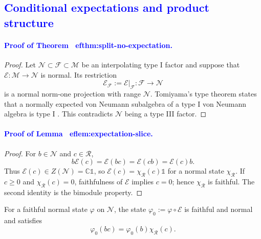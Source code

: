 \documentclass[a4paper,11pt]{article}
\theoremstyle{definition}
\let\mathbbm\mathds
\newcommand{\mR}{\mathcal{R}}
\newcommand{\mN}{\mathcal{N}}
\newcommand{\mM}{\mathcal{M}}
\newcommand{\NL}[1]{\textcolor{blue}{#1}}
\newcommand{\mE}{\mathcal{E}}
\begin{document}
\subsection{\NL{Conditional expectations and product structure}}
\label{app:expectation-proofs}

\NL{\paragraph{Proof of Theorem~
ef{thm:split-no-expectation}.}}
\begin{proof}
Let $\mN\subset\mathcal F\subset\mM$ be an interpolating type I
factor and suppose that $\mE:\mM\to \mN$ is normal.  Its restriction
\begin{equation}
 \mE_{\mathcal F}:=\mE|_{\mathcal F}:\mathcal F\longrightarrow\mN
\end{equation}
is a normal norm-one projection with range $\mN$.  Tomiyama's type
theorem states that a normally expected von Neumann subalgebra of a type I von
Neumann algebra is type I \cite{Tomiyama1959}\cite{Takesaki1972}. This contradicts $\mN$ being a type III factor.
\end{proof}

\NL{\paragraph{Proof of Lemma~
ef{lem:expectation-slice}.}}
\begin{proof}
For $b\in\mN$ and $c\in\mR$,
\begin{equation}
 b \mE(c)=\mE(b c)=\mE(c b)=\mE(c)b.
\end{equation}
Thus $\mE(c)\in Z(\mN)=\mathbb C\mathbbm 1$, so
$\mE(c)=\chi_{\mR}(c)\mathbbm 1$ for a normal state $\chi_{\mR}$.  If $c\geq0$ and
$\chi_{\mR}(c)=0$, faithfulness of $\mE$ implies $c=0$; hence $\chi_{\mR}$ is faithful.  The
second identity is the bimodule property.
\end{proof}

For a faithful normal state $\varphi$ on $\mN$, the state
$\varphi_0:=\varphi\circ \mE$ is faithful and normal and satisfies
\begin{equation}
 \varphi_0(b c)=\varphi_0(b)\chi_{\mR}(c).
\end{equation}
\end{document}
